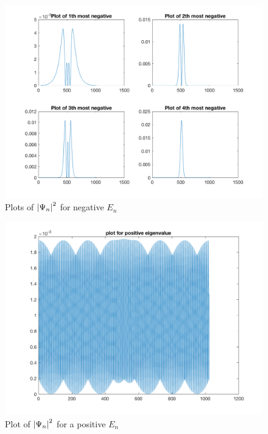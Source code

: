 \documentclass[paper=a4, fontsize=12pt]{scrartcl} %
\numberwithin{equation}{section}       %
\numberwithin{figure}{section}         %
\numberwithin{table}{section}          %
\begin{document}
\begin{center}
	\begin{figure}[h!]
	  \includegraphics[width=\linewidth]{negPsi}
	  \caption{Plots of $\abs{\Psi_n}^2$ for negative $E_n$}
	  \label{fig:negE}
	\end{figure}
\end{center}


\begin{center}
	\begin{figure}[h!]
	  \includegraphics[width=\linewidth]{posPsi}
	  \caption{Plot of $\abs{\Psi_n}^2$ for a positive $E_n$}
	  \label{fig:posE}
	\end{figure}
\end{center}
\end{document}
